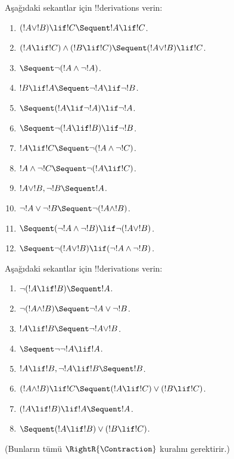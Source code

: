 \documentclass[../../../include/open-logic-section]{subfiles}
\begin{document}
\begin{prob}
Aşağıdaki sekantlar için !!{derivation}s verin:
\begin{enumerate}
\item $(!A \lor !B) \lif !C \Sequent !A \lif !C$.
\item $(!A \lif !C) \land (!B \lif !C) \Sequent (!A \lor !B) \lif !C$.
\item $\Sequent \lnot(!A \land \lnot !A)$.
\item $!B \lif !A \Sequent \lnot !A \lif \lnot !B$.
\item $\Sequent (!A \lif \lnot !A) \lif \lnot !A$.
\item $\Sequent \lnot(!A \lif !B) \lif \lnot !B$.
\item $!A \lif !C \Sequent \lnot (!A \land \lnot !C)$.
\item $!A \land \lnot !C \Sequent \lnot (!A \lif !C)$.
\item $!A \lor !B, \lnot !B \Sequent !A$.
\item $\lnot !A \lor \lnot !B \Sequent \lnot(!A \land !B)$.
\item $\Sequent (\lnot !A \land \lnot !B) \lif\lnot(!A \lor !B)$.
\item $\Sequent \lnot(!A \lor !B) \lif (\lnot !A \land \lnot !B)$.
\end{enumerate}
\end{prob}

\begin{prob}
Aşağıdaki sekantlar için !!{derivation}s verin:
\begin{enumerate}
\item $\lnot(!A \lif !B) \Sequent !A$.
\item $\lnot(!A \land !B) \Sequent \lnot !A \lor \lnot !B$.
\item $!A \lif !B \Sequent \lnot !A \lor !B$.
\item $\Sequent \lnot \lnot !A \lif !A$.
\item $!A \lif !B, \lnot !A \lif !B \Sequent !B$.
\item $(!A \land !B) \lif !C \Sequent (!A \lif !C) \lor (!B \lif !C)$.
\item $(!A \lif !B) \lif !A \Sequent !A$.
\item $\Sequent (!A \lif !B) \lor (!B \lif !C)$.
\end{enumerate}
(Bunların tümü $\RightR{\Contraction}$ kuralını gerektirir.)
\end{prob}
\end{document}
